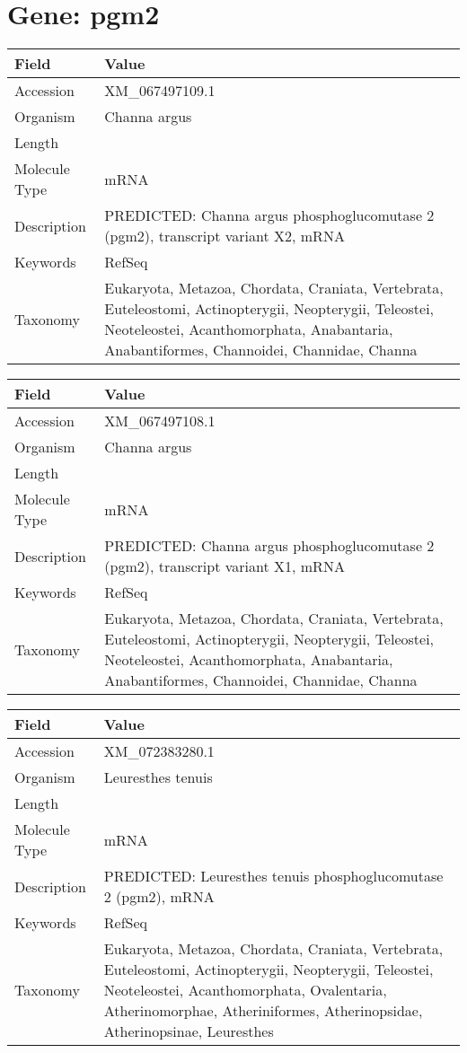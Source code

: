 \documentclass[10pt]{article}
\begin{document}
\section*{Gene: pgm2}
{\footnotesize
\begin{longtable}{>{\raggedright\arraybackslash}p{4.5cm} >{\raggedright\arraybackslash}p{11.5cm}}
\textbf{Field} & \textbf{Value} \\
\hline
Accession & XM\_067497109.1 \\
Organism & Channa argus \\
Length & 3234 \\
Molecule Type & mRNA \\
Description & PREDICTED: Channa argus phosphoglucomutase 2 (pgm2), transcript variant X2, mRNA \\
Keywords & RefSeq \\
Taxonomy & Eukaryota, Metazoa, Chordata, Craniata, Vertebrata, Euteleostomi, Actinopterygii, Neopterygii, Teleostei, Neoteleostei, Acanthomorphata, Anabantaria, Anabantiformes, Channoidei, Channidae, Channa \\
\end{longtable}
}

{\footnotesize
\begin{longtable}{>{\raggedright\arraybackslash}p{4.5cm} >{\raggedright\arraybackslash}p{11.5cm}}
\textbf{Field} & \textbf{Value} \\
\hline
Accession & XM\_067497108.1 \\
Organism & Channa argus \\
Length & 3236 \\
Molecule Type & mRNA \\
Description & PREDICTED: Channa argus phosphoglucomutase 2 (pgm2), transcript variant X1, mRNA \\
Keywords & RefSeq \\
Taxonomy & Eukaryota, Metazoa, Chordata, Craniata, Vertebrata, Euteleostomi, Actinopterygii, Neopterygii, Teleostei, Neoteleostei, Acanthomorphata, Anabantaria, Anabantiformes, Channoidei, Channidae, Channa \\
\end{longtable}
}

{\footnotesize
\begin{longtable}{>{\raggedright\arraybackslash}p{4.5cm} >{\raggedright\arraybackslash}p{11.5cm}}
\textbf{Field} & \textbf{Value} \\
\hline
Accession & XM\_072383280.1 \\
Organism & Leuresthes tenuis \\
Length & 2902 \\
Molecule Type & mRNA \\
Description & PREDICTED: Leuresthes tenuis phosphoglucomutase 2 (pgm2), mRNA \\
Keywords & RefSeq \\
Taxonomy & Eukaryota, Metazoa, Chordata, Craniata, Vertebrata, Euteleostomi, Actinopterygii, Neopterygii, Teleostei, Neoteleostei, Acanthomorphata, Ovalentaria, Atherinomorphae, Atheriniformes, Atherinopsidae, Atherinopsinae, Leuresthes \\
\end{longtable}
}
\end{document}
